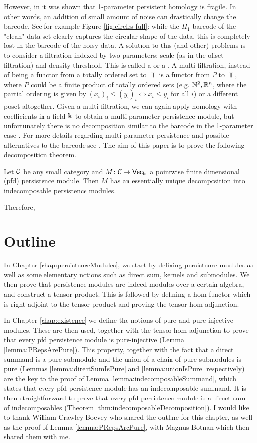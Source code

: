 However, in \cite[Section 4]{BulmbergEtal_2012} it was shown that 1-parameter persistent homology is fragile.
In other words, an addition of small amount of noise can drastically change the barcode.
See for example Figure \ref{fig:circles-full}: while the $H_1$ barcode of the "clean" data set clearly captures the circular shape of the data, this is completely lost in the barcode of the noisy data.
A solution to this (and other) problems is to consider a filtration indexed by two parameters: scale (as in the offset filtration) and density threshold. This is called a  or a .
A multi-filtration, instead of being a functor from a totally ordered set to $\Top$ is a functor from $P$ to $\Top$, where $P$ could be a finite product of totally ordered sets (e.g. $\mathbb{N}^2, \mathbb{R}^n$, where the partial ordering is given by $(x_i)_i\leq (y_i)_i\iff x_i\leq y_i$ for all $i$) or a different poset altogether. 
Given a multi-filtration, we can again apply homology with coefficients in a field $\mathbf{k}$ to obtain a multi-parameter persistence module, but unfortunately there is no decomposition similar to the barcode in the 1-parameter case \cite{gunnarAfra_2007}.
For more details regarding multi-parameter persistence and possible alternatives to the barcode see \cite{botnanLesnick_2022,botnan_2021}.
The aim of this paper is to prove the following decomposition theorem.
\begin{theorem}\label{theorem:main}
  Let $\mathcal{C}$ be any small category and $M\colon\mathcal{C}\to\normalfont\mathsf{Vec}_{\mathbf{k}}$ a pointwise finite dimensional (pfd) persistence module.
  Then $M$ has an essentially unique decomposition into indecomposable persistence modules.
\end{theorem}
Therefore,
\section{Outline}
In Chapter \ref{chap:persistenceModules}, we start by defining persistence modules as well as some elementary notions such as direct sum, kernels and submodules. 
We then prove that persistence modules are indeed modules over a certain algebra, and construct a tensor product.
This is followed by defining a hom functor which is right adjoint to the tensor product and proving the tensor-hom adjunction.

In Chapter \ref{chap:existence} we define the notions of pure and pure-injective modules. 
These are then used, together with the tensor-hom adjunction to prove that every pfd persistence module is pure-injective (Lemma \ref{lemma:PRepsArePure}).
This property, together with the fact that a direct summand is a pure submodule and the union of a chain of pure submodules is pure (Lemmas \ref{lemma:directSumIsPure} and \ref{lemma:unionIsPure} respectively) are the key to the proof of Lemma \ref{lemma:indecomposableSummand}, which states that every pfd persistence module has an indecomposable summand.
It is then straightforward to prove that every pfd persistence module is a direct sum of indecomposables (Theorem \ref{thm:indecomposableDecomposition}).
I would like to thank William Crawley-Boevey who shared the outline for this chapter, as well as the proof of Lemma \ref{lemma:PRepsArePure}, with Magnus Botnan which then shared them with me.

